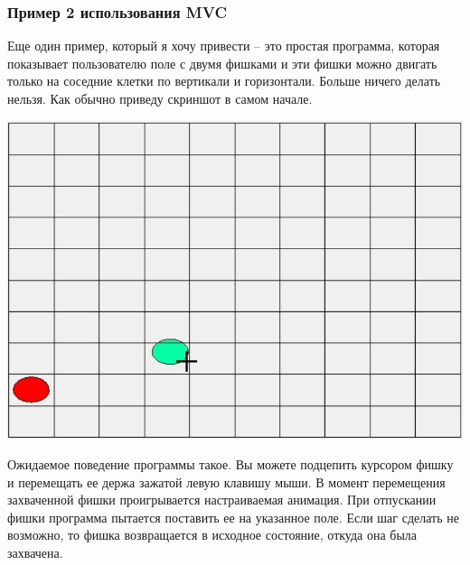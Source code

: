 \subsubsection{Пример 2 использования MVC}

Еще один пример, который я хочу привести -- это простая программа, которая показывает пользователю поле с двумя фишками и эти фишки можно двигать только на соседние клетки по вертикали и горизонтали.
Больше ничего делать нельзя.
Как обычно приведу скриншот в самом начале.
\begin{center}
\includegraphics[scale=0.6]{Figures/Game1.JPG}
\end{center}
Ожидаемое поведение программы такое.
Вы можете подцепить курсором фишку и перемещать ее держа зажатой левую клавишу мыши.
В момент перемещения захваченной фишки проигрывается настраиваемая анимация.
При отпускании фишки программа пытается поставить ее на указанное поле.
Если шаг сделать не возможно, то фишка возвращается в исходное состояние, откуда она была захвачена.

